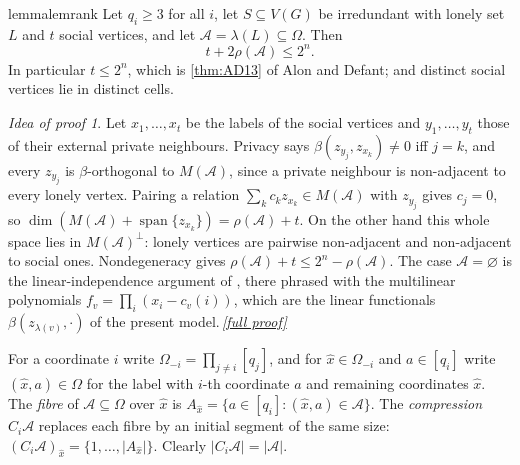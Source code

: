 \documentclass[11pt,a4paper]{article}
\theoremstyle{plain}
\theoremstyle{definition}
\theoremstyle{remark}
\newtheorem*{proofidea}{Idea of proof}
\newcommand{\fullproofref}[1]{\,\hyperref[#1]{\textit{[full proof]}}}
\newcommand{\cA}{\mathcal A}
\newcommand{\Om}{\Omega}
\newcommand{\rk}{\rho}
\newcommand{\spn}{\operatorname{span}}
\newcommand{\lab}{\lambda}
\begin{document}
\begin{restatable}{lemma}{lemrank}\label{lem:rank}
Let $q_i\ge3$ for all $i$, let $S\subseteq V(G)$ be irredundant with lonely set $L$ and $t$ social vertices, and let $\cA=\lab(L)\subseteq\Om$. Then
\begin{equation}\label{eq:rank}
t+2\rk(\cA)\le2^n .
\end{equation}
In particular $t\le2^n$, which is \cref{thm:AD13} of Alon and Defant; and distinct social vertices lie in distinct cells.
\end{restatable}
\begin{proofidea}
Let $x_1,\dots,x_t$ be the labels of the social vertices and $y_1,\dots,y_t$ those of their external private neighbours. Privacy says $\beta(z_{y_j},z_{x_k})\ne0$ iff $j=k$, and every $z_{y_j}$ is $\beta$-orthogonal to $M(\cA)$, since a private neighbour is non-adjacent to every lonely vertex. Pairing a relation $\sum_kc_kz_{x_k}\in M(\cA)$ with $z_{y_j}$ gives $c_j=0$, so $\dim(M(\cA)+\spn\{z_{x_k}\})=\rk(\cA)+t$. On the other hand this whole space lies in $M(\cA)^\perp$: lonely vertices are pairwise non-adjacent and non-adjacent to social ones. Nondegeneracy gives $\rk(\cA)+t\le2^n-\rk(\cA)$. The case $\cA=\varnothing$ is the linear-independence argument of \cite[proof of Theorem~1.3]{AD20}, there phrased with the multilinear polynomials $f_v=\prod_i(x_i-c_v(i))$, which are the linear functionals $\beta(z_{\lab(v)},\cdot)$ of the present model.\fullproofref{pf:rank}
\end{proofidea}

For a coordinate $i$ write $\Om_{-i}=\prod_{j\ne i}[q_j]$, and for $\hat x\in\Om_{-i}$ and $a\in[q_i]$ write $(\hat x,a)\in\Om$ for the label with $i$-th coordinate $a$ and remaining coordinates $\hat x$. The \emph{fibre} of $\cA\subseteq\Om$ over $\hat x$ is $A_{\hat x}=\{a\in[q_i]:(\hat x,a)\in\cA\}$. The \emph{compression} $C_i\cA$ replaces each fibre by an initial segment of the same size: $(C_i\cA)_{\hat x}=\{1,\dots,|A_{\hat x}|\}$. Clearly $|C_i\cA|=|\cA|$.
\end{document}
